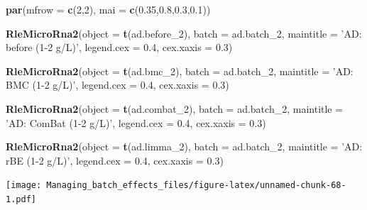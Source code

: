\documentclass[]{book}
\newenvironment{Shaded}{\begin{snugshade}}{\end{snugshade}}
\newcommand{\KeywordTok}[1]{\textcolor[rgb]{0.13,0.29,0.53}{\textbf{#1}}}
\newcommand{\DataTypeTok}[1]{\textcolor[rgb]{0.13,0.29,0.53}{#1}}
\newcommand{\DecValTok}[1]{\textcolor[rgb]{0.00,0.00,0.81}{#1}}
\newcommand{\FloatTok}[1]{\textcolor[rgb]{0.00,0.00,0.81}{#1}}
\newcommand{\StringTok}[1]{\textcolor[rgb]{0.31,0.60,0.02}{#1}}
\newcommand{\NormalTok}[1]{#1}
\begin{document}
\begin{Shaded}
\begin{Highlighting}[]
\KeywordTok{par}\NormalTok{(}\DataTypeTok{mfrow =} \KeywordTok{c}\NormalTok{(}\DecValTok{2}\NormalTok{,}\DecValTok{2}\NormalTok{), }\DataTypeTok{mai =} \KeywordTok{c}\NormalTok{(}\FloatTok{0.35}\NormalTok{,}\FloatTok{0.8}\NormalTok{,}\FloatTok{0.3}\NormalTok{,}\FloatTok{0.1}\NormalTok{))}

\KeywordTok{RleMicroRna2}\NormalTok{(}\DataTypeTok{object =} \KeywordTok{t}\NormalTok{(ad.before_}\DecValTok{2}\NormalTok{), }\DataTypeTok{batch =}\NormalTok{ ad.batch_}\DecValTok{2}\NormalTok{, }
             \DataTypeTok{maintitle =} \StringTok{'AD: before (1-2 g/L)'}\NormalTok{, }\DataTypeTok{legend.cex =} \FloatTok{0.4}\NormalTok{, }
             \DataTypeTok{cex.xaxis =} \FloatTok{0.3}\NormalTok{)}

\KeywordTok{RleMicroRna2}\NormalTok{(}\DataTypeTok{object =} \KeywordTok{t}\NormalTok{(ad.bmc_}\DecValTok{2}\NormalTok{), }\DataTypeTok{batch =}\NormalTok{ ad.batch_}\DecValTok{2}\NormalTok{, }
             \DataTypeTok{maintitle =} \StringTok{'AD: BMC (1-2 g/L)'}\NormalTok{, }\DataTypeTok{legend.cex =} \FloatTok{0.4}\NormalTok{, }
             \DataTypeTok{cex.xaxis =} \FloatTok{0.3}\NormalTok{)}

\KeywordTok{RleMicroRna2}\NormalTok{(}\DataTypeTok{object =} \KeywordTok{t}\NormalTok{(ad.combat_}\DecValTok{2}\NormalTok{), }\DataTypeTok{batch =}\NormalTok{ ad.batch_}\DecValTok{2}\NormalTok{, }
             \DataTypeTok{maintitle =} \StringTok{'AD: ComBat (1-2 g/L)'}\NormalTok{, }\DataTypeTok{legend.cex =} \FloatTok{0.4}\NormalTok{, }
             \DataTypeTok{cex.xaxis =} \FloatTok{0.3}\NormalTok{)}

\KeywordTok{RleMicroRna2}\NormalTok{(}\DataTypeTok{object =} \KeywordTok{t}\NormalTok{(ad.limma_}\DecValTok{2}\NormalTok{), }\DataTypeTok{batch =}\NormalTok{ ad.batch_}\DecValTok{2}\NormalTok{, }
             \DataTypeTok{maintitle =} \StringTok{'AD: rBE (1-2 g/L)'}\NormalTok{, }\DataTypeTok{legend.cex =} \FloatTok{0.4}\NormalTok{, }
             \DataTypeTok{cex.xaxis =} \FloatTok{0.3}\NormalTok{)}
\end{Highlighting}
\end{Shaded}

\texttt{[image: Managing\_batch\_effects\_files/figure-latex/unnamed-chunk-68-1.pdf]}
\end{document}
